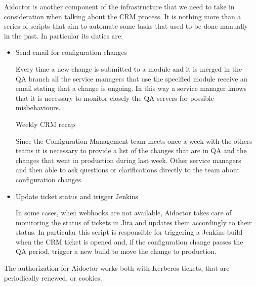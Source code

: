 Aidoctor is another component of the infrastructure that we need to take in
consideration when talking about the CRM process. It is nothing more than
a series of scripts that aim to automate some tasks that used to be done
manually in the past. In particular its duties are:

\begin{itemize}

  \item Send email for configuration changes

  Every time a new change is submitted to a module and it is merged in the QA
  branch all the service managers that use the specified module receive an
  email stating that a change is ongoing. In this way a service manager knows
  that it is necessary to monitor closely the QA servers for possible
  misbehaviours.

  \send Weekly CRM recap

  Since the Configuration Management team meets once a week with the others
  teams it is necessary to provide a list of the changes that are in QA and the
  changes that went in production during last week. Other service managers and
  then able to ask questions or clarifications directly to the team about
  configuration changes.

  \item Update ticket status and trigger Jenkins

  In some cases, when webhooks are not available, Aidoctor takes care of
  monitoring the status of tickets in Jira and updates them accordingly to
  their status. In particular this script is responsible for triggering
  a Jenkins build when the CRM ticket is opened and, if the configuration
  change passes the QA period, trigger a new build to move the change to
  production.

\end{itemize}

The authorization for Aidoctor works both with Kerberos tickets, that are
periodically renewed, or cookies.
